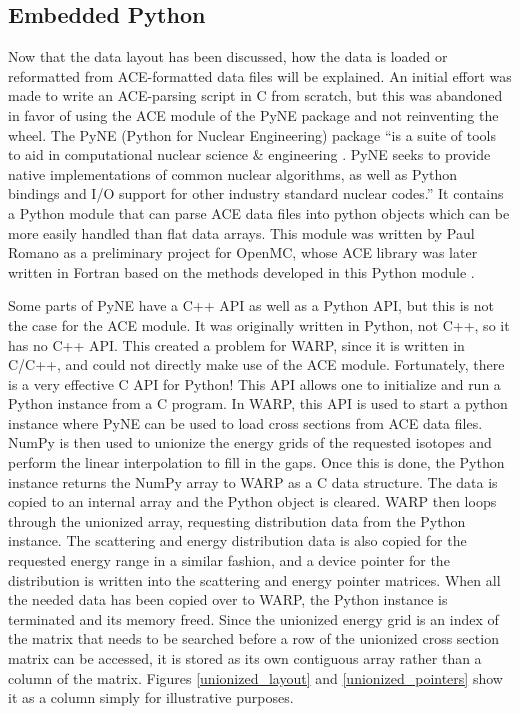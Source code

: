 \subsection{Embedded Python}

Now that the data layout has been discussed, how the data is loaded or reformatted from ACE-formatted data files will be explained.  An initial effort was made to write an ACE-parsing script in C from scratch, but this was abandoned in favor of using the ACE module of the PyNE package and not reinventing the wheel.  The PyNE (Python for Nuclear Engineering) package ``is a suite of tools to aid in computational nuclear science \& engineering \cite{pyne}. PyNE seeks to provide native implementations of common nuclear algorithms, as well as Python bindings and I/O support for other industry standard nuclear codes.''  It contains a Python module that can parse ACE data files into python objects which can be more easily handled than flat data arrays.  This module was written by Paul Romano as a preliminary project for OpenMC, whose ACE library was later written in Fortran based on the methods developed in this Python module \cite{pyne,openmc}.  

Some parts of PyNE have a C++ API as well as a Python API, but this is not the case for the ACE module.  It was originally written in Python, not C++, so it has no C++ API.  This created a problem for WARP, since it is written in C/C++, and could not directly make use of the ACE module.  Fortunately, there is a very effective C API for Python!  This API allows one to initialize and run a Python instance from a C program.  In WARP, this API is used to start a python instance where PyNE can be used to load cross sections from ACE data files.  NumPy is then used to unionize the energy grids of the requested isotopes and perform the linear interpolation to fill in the gaps.  Once this is done, the Python instance returns the NumPy array to WARP as a C data structure.  The data is copied to an internal array and the Python object is cleared.  WARP then loops through the unionized array, requesting distribution data from the Python instance.  The scattering and energy distribution data is also copied for the requested energy range in a similar fashion, and a device pointer for the distribution is written into the scattering and energy pointer matrices.  When all the needed data has been copied over to WARP, the Python instance is terminated and its memory freed.  Since the unionized energy grid is an index of the matrix that needs to be searched before a row of the unionized cross section matrix can be accessed, it is stored as its own contiguous array rather than a column of the matrix.  Figures \ref{unionized_layout} and \ref{unionized_pointers} show it as a column simply for illustrative purposes.

